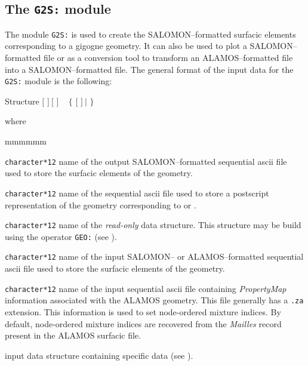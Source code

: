 \subsection{The {\tt G2S:} module}\label{sect:G2SData}

The module {\tt G2S:} is used to create the SALOMON--formatted surfacic elements corresponding
to a gigogne geometry. It can also be used to plot a SALOMON--formatted file or as a conversion tool to transform an ALAMOS--formatted file into
a SALOMON--formatted file. The general format of the input data for the {\tt G2S:} module is the following:
\begin{DataStructure}{Structure }
$[$  $]~[$  $]$ \moc{:=} ~ $\{$  $[$  $]~|$  $\}$ ~\moc{::}~ \\
\end{DataStructure}

\noindent where
\begin{ListeDeDescription}{mmmmmm}

\item[\dusa{SURFIL}] \texttt{character*12} name of the output SALOMON--formatted sequential {\sc ascii}
file used to store the surfacic elements of the geometry.

\item[\dusa{PSFIL}] \texttt{character*12} name of the sequential {\sc ascii}
file used to store a postscript representation of the geometry corresponding to  or .

\item[\dusa{GEONAM}] {\tt character*12} name of the {\sl read-only}  data
structure. This structure may be build using the operator {\tt GEO:} (see ).

\item[\dusa{SURFIL\_IN}] \texttt{character*12} name of the input SALOMON-- or ALAMOS--formatted sequential {\sc ascii}
file used to store the surfacic elements of the geometry.

\item[\dusa{ZAFIL\_IN}] \texttt{character*12} name of the input sequential {\sc ascii} file containing {\sl PropertyMap}
information associated with the ALAMOS geometry. This file generally has a {\tt .za} extension. This information is used to
set node-ordered mixture indices. By default, node-ordered mixture indices are recovered from the {\sl Mailles} record present
in the ALAMOS surfacic file.

\item[\dusa{G2S\_data}] input data structure containing specific data (see ).
\end{ListeDeDescription}


